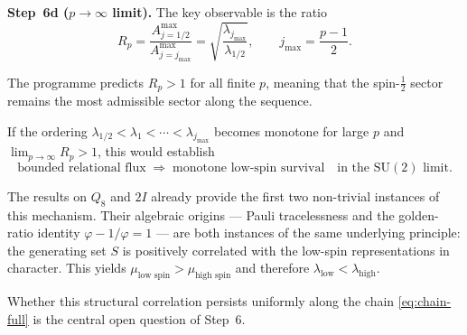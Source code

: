 \documentclass[11pt,a4paper]{article}
\begin{document}
    \medskip
    \noindent\textbf{Step~6d ($p\to\infty$ limit).}
    The key observable is the ratio
    \begin{equation}
      R_p
      =
      \frac{A^{\max}_{j=1/2}}{A^{\max}_{j=j_{\max}}}
      =
      \sqrt{\frac{\lambda_{j_{\max}}}{\lambda_{1/2}}},
      \qquad
      j_{\max} = \frac{p-1}{2}.
      \label{eq:ratio-p}
    \end{equation}

    The programme predicts $R_p>1$ for all finite $p$,
    meaning that the spin-$\tfrac12$ sector remains the most
    admissible sector along the sequence.

    If the ordering
    $\lambda_{1/2} < \lambda_1 < \cdots < \lambda_{j_{\max}}$
    becomes monotone for large $p$ and
    $\lim_{p\to\infty} R_p > 1$,
    this would establish
    \begin{equation}
      \text{bounded relational flux}
      \;\Longrightarrow\;
      \text{monotone low-spin survival}
      \quad
      \text{in the }\mathrm{SU}(2)\text{ limit.}
      \label{eq:conclusion}
    \end{equation}

    The results on $Q_8$ and $2I$ already provide the first two
    non-trivial instances of this mechanism.
    Their algebraic origins — Pauli tracelessness and the golden-ratio
    identity $\varphi - 1/\varphi = 1$ — are both instances of the same
    underlying principle: the generating set $S$ is positively correlated
    with the low-spin representations in character.
    This yields
    $\mu_{\text{low spin}} > \mu_{\text{high spin}}$
    and therefore
    $\lambda_{\text{low}} < \lambda_{\text{high}}$.

    Whether this structural correlation persists uniformly along the chain
    \eqref{eq:chain-full} is the central open question of Step~6.
\end{document}
